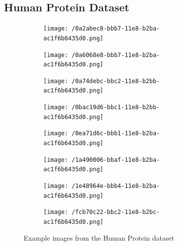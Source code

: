 \documentclass{article}
\begin{document}
\subsection{Human Protein Dataset}
\begin{figure}[ht]
    \centering
    \begin{subfigure}[b]{0.2\linewidth}
      \texttt{[image: /0a2abec8-bbb7-11e8-b2ba-ac1f6b6435d0.png]}
    \end{subfigure}
    \begin{subfigure}[b]{0.2\linewidth}
      \texttt{[image: /0a6068e8-bbb7-11e8-b2ba-ac1f6b6435d0.png]}
    \end{subfigure}
    \begin{subfigure}[b]{0.2\linewidth}
        \texttt{[image: /0a74debc-bbc2-11e8-b2bb-ac1f6b6435d0.png]}
    \end{subfigure}
    \begin{subfigure}[b]{0.2\linewidth}
        \texttt{[image: /0bac19d6-bbc1-11e8-b2bb-ac1f6b6435d0.png]}
    \end{subfigure}

    \begin{subfigure}[b]{0.2\linewidth}
        \texttt{[image: /0ea71d6c-bbb1-11e8-b2ba-ac1f6b6435d0.png]}
      \end{subfigure}
      \begin{subfigure}[b]{0.2\linewidth}
        \texttt{[image: /1a490006-bbaf-11e8-b2ba-ac1f6b6435d0.png]}
      \end{subfigure}
      \begin{subfigure}[b]{0.2\linewidth}
          \texttt{[image: /1e48964e-bbb4-11e8-b2ba-ac1f6b6435d0.png]}
      \end{subfigure}
      \begin{subfigure}[b]{0.2\linewidth}
          \texttt{[image: /fcb70c22-bbc2-11e8-b2bc-ac1f6b6435d0.png]}
      \end{subfigure}
    \caption{Example images from the Human Protein dataset}
  \end{figure}
\end{document}
